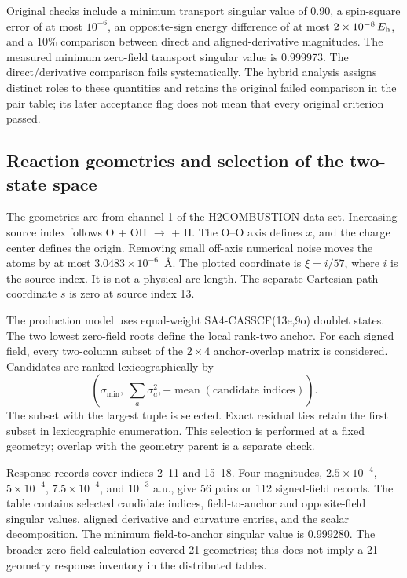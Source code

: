 \documentclass[aip,jcp,amsmath,amssymb,preprint,floatfix]{revtex4-1}
\begin{document}
Original checks include a minimum transport singular value of 0.90,
a spin-square error of at most $10^{-6}$, an opposite-sign energy
difference of at most $2\times10^{-8}\,E_{\mathrm h}$, and a 10\% comparison
between direct and aligned-derivative magnitudes. The measured minimum
zero-field transport singular value is 0.999973. The direct/derivative
comparison fails systematically. The hybrid analysis assigns distinct
roles to these quantities and retains the original failed comparison in
the pair table; its later acceptance flag does not mean that every
original criterion passed.

\subsection{Reaction geometries and selection of the two-state space}
The geometries are from channel 1 of the H2COMBUSTION data set.
\cite{Guan2022_hydrogen_combustion}
Increasing source index follows O + OH $\rightarrow$  + H.
The O--O axis defines $x$, and the charge center defines the origin.
Removing small off-axis numerical noise moves the atoms by at most
$3.0483\times10^{-6}$~\AA. The plotted coordinate is
$\xi=i/57$, where $i$ is the source index. It is not a physical arc length.
The separate Cartesian path coordinate $s$ is zero at source index 13.

The production model uses equal-weight SA4-CASSCF(13e,9o) doublet states.
The two lowest zero-field roots define the local rank-two anchor. For each
signed field, every two-column subset of the $2\times4$ anchor-overlap
matrix is considered. Candidates are ranked lexicographically by
\begin{equation}
\left(\sigma_{\min},\ \sum_a\sigma_a^2,
-\operatorname{mean}(\text{candidate indices})\right).
\end{equation}
The subset with the largest tuple is selected. Exact residual ties retain
the first subset in lexicographic enumeration. This selection is performed
at a fixed geometry; overlap with the geometry parent is a separate check.

Response records cover indices 2--11 and 15--18. Four magnitudes,
$2.5\times10^{-4}$, $5\times10^{-4}$, $7.5\times10^{-4}$, and $10^{-3}$
a.u., give 56 pairs or 112 signed-field records. The table contains selected
candidate indices, field-to-anchor and opposite-field singular values,
aligned derivative and curvature entries, and the scalar decomposition.
The minimum field-to-anchor singular value is 0.999280. The broader
zero-field calculation covered 21 geometries; this does not imply a
21-geometry response inventory in the distributed tables.
\end{document}
